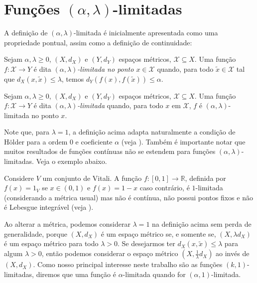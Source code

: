 \section{Funções \texorpdfstring{$(\alpha, \lambda)$}{(alpha, lambda)}-limitadas}
\vspace{1cm}
A definição de $(\alpha,\lambda)$-limitada é inicialmente apresentada como uma propriedade pontual, assim como a definição de continuidade:
\begin{definition}
  Sejam $\alpha, \lambda \ge 0$, $(X, d_X)$ e $(Y, d_Y)$ espaços métricos, $\mathcal{X} \subseteq X$. Uma função $f : \mathcal{X} \to Y$ é dita \textit{$(\alpha,\lambda)$-limitada no ponto $x \in \mathcal{X}$} quando, para todo $\tilde{x} \in \mathcal{X}$ tal que $d_X(x, \tilde{x}) \le \lambda$, temos $d_Y(f(x), f(\tilde{x})) \le \alpha$.
\end{definition}


\vspace{1cm}

\begin{definition}
  Sejam $\alpha, \lambda \ge 0$, $(X, d_X)$ e $(Y, d_Y)$ espaços métricos, $\mathcal{X} \subseteq X$. Uma função $f : \mathcal{X} \to Y$ é dita \textit{$(\alpha,\lambda)$-limitada} quando, para todo $x$ em $\mathcal{X}$, $f$ é $(\alpha,\lambda)$-limitada no ponto $x$.
\end{definition}

Note que, para $\lambda = 1$, a definição acima adapta naturalmente a condição de Hölder para a ordem $0$ e coeficiente $\alpha$ (veja \cite{holder}). Também é importante notar que muitos resultados de funções contínuas não se estendem para funções $(\alpha, \lambda)$-limitadas. Veja o exemplo abaixo.

\begin{example} \label{vitali}
  Considere $V$ um conjunto de Vitali. A função $f : [0, 1] \to \mathbb{R}$, definida por $f(x) = 1_V$ se $x \in (0, 1)$ e $f(x) = 1 - x$ caso contrário, é $1$-limitada (considerando a métrica usual) mas não é contínua, não possui pontos fixos e não é Lebesgue integrável (veja \cite{vitali}).
\end{example}

Ao alterar a métrica, podemos considerar $\lambda = 1$ na definição acima sem perda de generalidade, porque $(X, d_X)$ é um espaço métrico se, e somente se, $(X, \lambda d_X)$ é um espaço métrico para todo $\lambda > 0$. Se desejarmos ter $d_X(x, \tilde{x}) \le \lambda$ para algum $\lambda > 0$, então podemos considerar o espaço métrico $(X, \frac{1}{\lambda} d_X)$ ao invés de $(X, d_X)$. Como nosso principal interesse neste trabalho são as funções $(k,1)$-limitadas, diremos que uma função é $\alpha$-limitada quando for $(\alpha,1)$-limitada.

